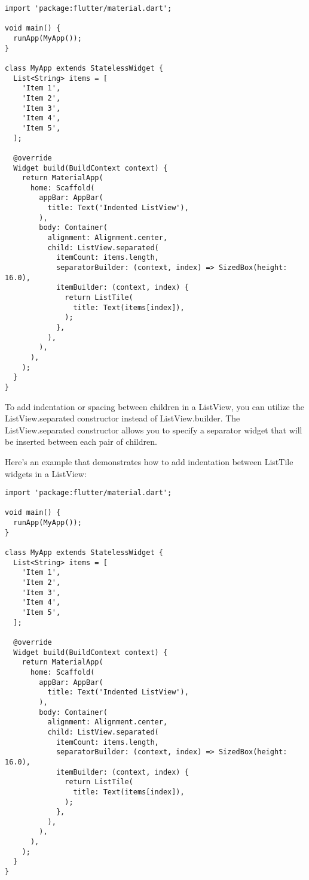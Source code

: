\begin{lstlisting}
import 'package:flutter/material.dart';

void main() {
  runApp(MyApp());
}

class MyApp extends StatelessWidget {
  List<String> items = [
    'Item 1',
    'Item 2',
    'Item 3',
    'Item 4',
    'Item 5',
  ];

  @override
  Widget build(BuildContext context) {
    return MaterialApp(
      home: Scaffold(
        appBar: AppBar(
          title: Text('Indented ListView'),
        ),
        body: Container(
          alignment: Alignment.center,
          child: ListView.separated(
            itemCount: items.length,
            separatorBuilder: (context, index) => SizedBox(height: 16.0),
            itemBuilder: (context, index) {
              return ListTile(
                title: Text(items[index]),
              );
            },
          ),
        ),
      ),
    );
  }
}
\end{lstlisting}

To add indentation or spacing between children in a ListView, you can utilize the ListView.separated constructor 
instead of ListView.builder. The ListView.separated constructor allows you to specify a separator widget that will 
be inserted between each pair of children.

Here's an example that demonstrates how to add indentation between ListTile widgets in a ListView:

\begin{lstlisting}
import 'package:flutter/material.dart';

void main() {
  runApp(MyApp());
}

class MyApp extends StatelessWidget {
  List<String> items = [
    'Item 1',
    'Item 2',
    'Item 3',
    'Item 4',
    'Item 5',
  ];

  @override
  Widget build(BuildContext context) {
    return MaterialApp(
      home: Scaffold(
        appBar: AppBar(
          title: Text('Indented ListView'),
        ),
        body: Container(
          alignment: Alignment.center,
          child: ListView.separated(
            itemCount: items.length,
            separatorBuilder: (context, index) => SizedBox(height: 16.0),
            itemBuilder: (context, index) {
              return ListTile(
                title: Text(items[index]),
              );
            },
          ),
        ),
      ),
    );
  }
}
\end{lstlisting}

